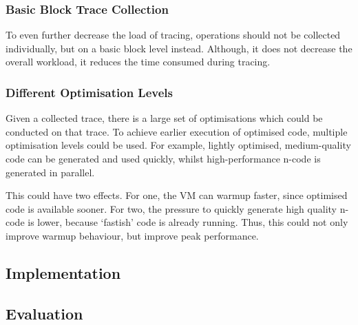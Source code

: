\subsubsection{Basic Block Trace Collection} To even further decrease the load of
tracing, operations should not be collected individually, but on a basic block
level instead. Although, it does not decrease the overall workload, it reduces
the time consumed during tracing.

\subsubsection{Different Optimisation Levels}

Given a collected trace, there is a large set of optimisations which could be
conducted on that trace. To achieve earlier execution of
optimised code, multiple optimisation levels could be used. For example,
lightly optimised, medium-quality code can be generated and used quickly, whilst
high-performance n-code is generated in parallel.

This could have two effects. For one, the VM can warmup faster, since optimised
code is available sooner. For two, the pressure to quickly generate high quality
n-code is lower, because `fastish' code is already running. Thus, this could not
only improve warmup behaviour, but improve peak performance.

\subsection{Implementation}


\subsection{Evaluation}

